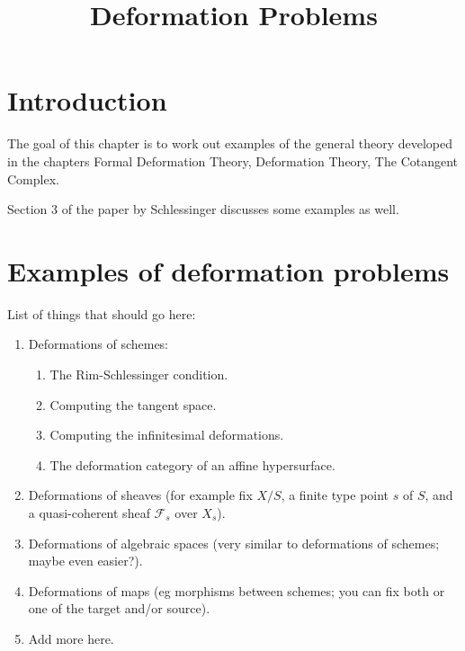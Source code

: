

%


\title{Deformation Problems}

\maketitle

\label{section-phantom}

\tableofcontents

\section{Introduction}
\label{section-introduction}

\noindent
The goal of this chapter is to work out examples of the general theory
developed in the chapters Formal Deformation Theory,
Deformation Theory, The Cotangent Complex.

\medskip\noindent
Section 3 of the paper \cite{Sch} by Schlessinger discusses some
examples as well.






\section{Examples of deformation problems}
\label{section-examples}

\noindent
List of things that should go here:
\begin{enumerate}
\item Deformations of schemes:
\begin{enumerate}
\item The Rim-Schlessinger condition.
\item Computing the tangent space.
\item Computing the infinitesimal deformations.
\item The deformation category of an affine hypersurface.
\end{enumerate}
\item Deformations of sheaves (for example fix $X/S$, a finite type point
$s$ of $S$, and a quasi-coherent sheaf $\mathcal{F}_s$ over $X_s$).
\item Deformations of algebraic spaces (very similar to deformations
of schemes; maybe even easier?).
\item Deformations of maps (eg morphisms between schemes; you can fix
both or one of the target and/or source).
\item Add more here.
\end{enumerate}





